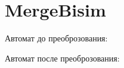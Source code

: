 \section{MergeBisim}
\begin{frame}{}
	Автомат до преоброзования:


	Автомат после преоброзования:

\end{frame}

